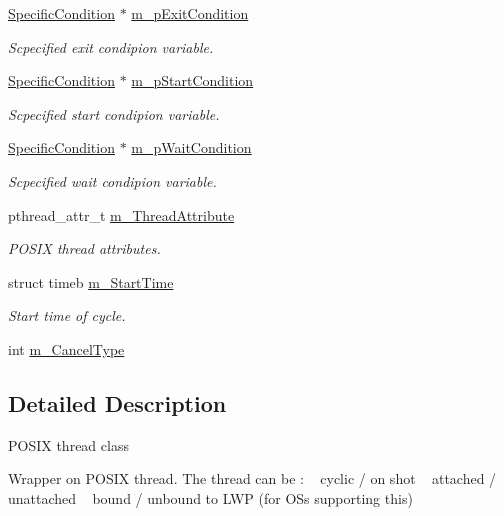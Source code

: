 \begin{DoxyCompactItemize}
\hyperlink{classSpecificCondition}{Specific\+Condition} $\ast$ \hyperlink{classPThreadClass_a24f676a031214426786294fd15daca30}{m\+\_\+p\+Exit\+Condition}
\begin{DoxyCompactList}\small\item\em Scpecified exit condipion variable. \end{DoxyCompactList}\item 
\hyperlink{classSpecificCondition}{Specific\+Condition} $\ast$ \hyperlink{classPThreadClass_ae7da7ff84d5d96f3dae9d539a0ce8bcb}{m\+\_\+p\+Start\+Condition}
\begin{DoxyCompactList}\small\item\em Scpecified start condipion variable. \end{DoxyCompactList}\item 
\hyperlink{classSpecificCondition}{Specific\+Condition} $\ast$ \hyperlink{classPThreadClass_a1889576909d898228cc4e2eda3acbf8b}{m\+\_\+p\+Wait\+Condition}
\begin{DoxyCompactList}\small\item\em Scpecified wait condipion variable. \end{DoxyCompactList}\item 
pthread\+\_\+attr\+\_\+t \hyperlink{classPThreadClass_a1c637c9e20fb8ccbd8bd9e5431c31883}{m\+\_\+\+Thread\+Attribute}
\begin{DoxyCompactList}\small\item\em P\+O\+S\+IX thread attributes. \end{DoxyCompactList}\item 
struct timeb \hyperlink{classPThreadClass_a21352db28ed04eabcb2d7e353c886319}{m\+\_\+\+Start\+Time}
\begin{DoxyCompactList}\small\item\em Start time of cycle. \end{DoxyCompactList}\item 
int \hyperlink{classPThreadClass_adf415e7e1021b7234ed371744a545daf}{m\+\_\+\+Cancel\+Type}
\end{DoxyCompactItemize}


\subsection{Detailed Description}
P\+O\+S\+IX thread class

Wrapper on P\+O\+S\+IX thread. The thread can be \+: ~\newline
 cyclic / on shot ~\newline
 attached / unattached ~\newline
 bound / unbound to L\+WP (for O\+Ss supporting this) 

